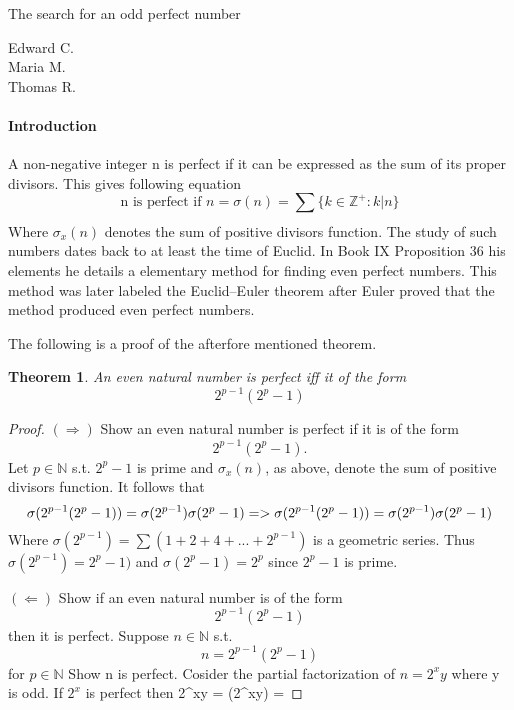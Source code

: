 \documentclass[12pt]{article}
\newtheorem{theorem}{Theorem}
\begin{document}
\begin{center}
	\Large
	The search for an odd perfect number
\end{center}

\begin{flushright}
	Edward C.\\
	\vspace{2 mm}
	Maria M.\\
	\vspace{2 mm}
	Thomas R.\\
\end{flushright}

\paragraph*{Introduction}
	A non-negative integer n is perfect if it can be expressed as the sum of its proper divisors. This gives following equation 
	$$\text{n is perfect if } n = \sigma(n) = \sum_{}{}\{k \in \mathbb{Z}^+ : k|n\}$$  Where $\sigma_x (n)$ 
	denotes the sum of positive divisors function.  The study of such numbers dates back to at least the 
	time of Euclid. In Book IX Proposition 36 his elements he details a elementary method for finding even
	perfect numbers.  This method was later labeled the Euclid–Euler theorem
	after Euler proved that the method produced even perfect numbers.
	
	The following is a proof of the afterfore mentioned theorem.
	
	\begin{theorem}
		An even natural number is perfect iff it of the form $$2^{p-1} (2^{p} - 1)$$
	\end{theorem}
	
	\begin{proof}
		$(\Rightarrow)$
			Show an even natural number is perfect if it is of the form  $$2^{p-1} (2^{p} - 1).$$
			Let $p \in \mathbb{N}$ s.t. $2^{p}-1$ is prime and $\sigma_x (n)$, as above, denote the sum of positive divisors function.
			It follows that $$\sigma (2^{p-1}(2^{p}-1))=\sigma (2^{p-1})\sigma (2^{p}-1) \newline =>
			\sigma (2^{p-1}(2^{p}-1))=\sigma (2^{p-1})\sigma (2^{p}-1)$$
			Where $\sigma (2^{p-1}) = \sum{}{}(1 + 2 + 4 + ... + 2^{p-1})$ is a geometric series.\newline
			Thus $\sigma (2^{p-1}) = 2^{p}-1)$ and $\sigma (2^{p}-1) = 2^{p}$ since $2^{p}-1$ is prime.
		
		$(\Leftarrow)$
			Show if an even natural number is of the form  $$2^{p-1} (2^{p} - 1)$$ then it is perfect.
			Suppose $n \in \mathbb{N}$ s.t. $$n = 2^{p-1} (2^{p} - 1)$$ for $p \in \mathbb{N}$
			Show n is perfect.
			Cosider the partial factorization of $n = 2^{x}y$ where y is odd.
			If $2^{x}$ is perfect then 2^{x}y = \sigma (2^{x}y) = 
 
	\end{proof}
	
\end{document}
